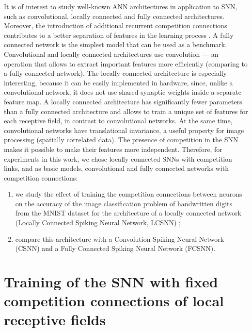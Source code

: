 \documentclass[a4paper]{article}
\begin{document}
It is of interest to study well-known ANN architectures in application to SNN, such as convolutional, locally connected and fully connected \cite{Khan_2020} architectures. Moreover, the introduction of additional recurrent competition connections contributes to a better separation of features in the learning process \cite{MaxActiv1, MaxActiv2}. A fully connected network is the simplest model that can be used as a benchmark. Convolutional and locally connected architectures use convolution --- an operation that allows to extract important features more efficiently (comparing to a fully connected network). The locally connected architecture is especially interesting, because it can be easily implemented in hardware, since, unlike a convolutional network, it does not use shared synaptic weights  inside a separate feature map. A locally connected architecture has significantly fewer parameters than a fully connected architecture and allows to train a unique set of features for each receptive field, in contrast to convolutional networks. At the same time, convolutional networks have translational invariance, a useful property for image processing (spatially correlated data). The presence of competition in the SNN makes it possible to make their features more independent. Therefore, for experiments in this work, we chose locally connected SNNs with competition links, and as basic models, convolutional and fully connected networks with competition connections:

\begin{enumerate}[i]
\item we study the effect of training the competition connections \cite{MaxActiv1, MaxActiv2, hardware_survey} between neurons on the accuracy of the image classification problem of handwritten digits from the MNIST \cite{MNIST} dataset for the architecture of a locally connected network (Locally Connected Spiking Neural Network, LCSNN) \cite{saunders2019locally};

\item compare this architecture with a Convolution Spiking Neural Network (CSNN) and a Fully Connected Spiking Neural Network (FCSNN).
\end{enumerate}

\clearpage

\section{Training of the SNN with fixed competition connections of local receptive fields}
\end{document}

